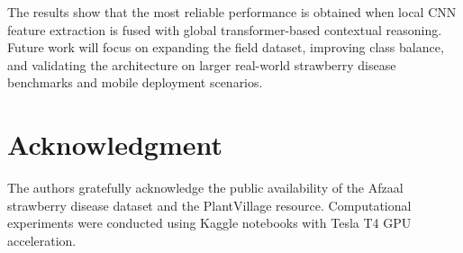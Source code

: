 \documentclass[conference]{IEEEtran}
\begin{document}
The results show that the most reliable performance is obtained when local CNN feature extraction is fused with global transformer-based contextual reasoning. Future work will focus on expanding the field dataset, improving class balance, and validating the architecture on larger real-world strawberry disease benchmarks and mobile deployment scenarios.

\section*{Acknowledgment}
The authors gratefully acknowledge the public availability of the Afzaal strawberry disease dataset and the PlantVillage resource. Computational experiments were conducted using Kaggle notebooks with Tesla T4 GPU acceleration.



\end{document}

